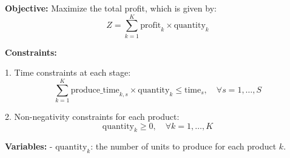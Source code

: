 \documentclass{article}
\begin{document}
\textbf{Objective:}
Maximize the total profit, which is given by:
\[
Z = \sum_{k=1}^{K} \text{profit}_{k} \times \text{quantity}_{k}
\]

\textbf{Constraints:}

1. Time constraints at each stage:
\[
\sum_{k=1}^{K} \text{produce\_time}_{k,s} \times \text{quantity}_{k} \leq \text{time}_{s}, \quad \forall s = 1, \ldots, S
\]

2. Non-negativity constraints for each product:
\[
\text{quantity}_{k} \geq 0, \quad \forall k = 1, \ldots, K
\]

\textbf{Variables:}
- \(\text{quantity}_{k}\): the number of units to produce for each product \(k\).
\end{document}
